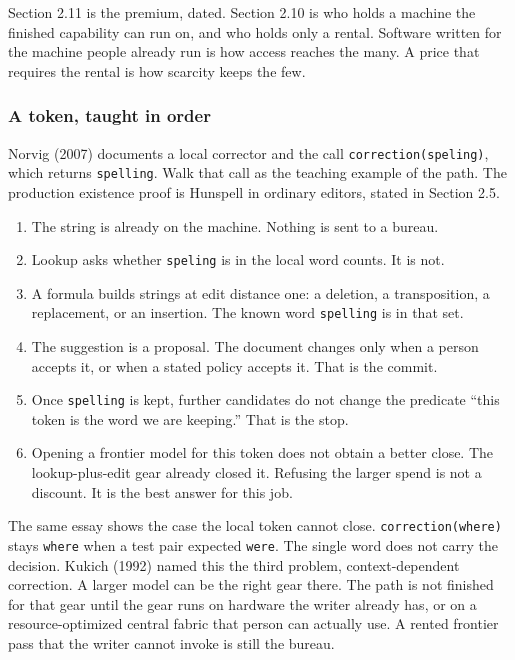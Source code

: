 \documentclass[
  10pt,
]{article}
\providecommand{\tightlist}{%
  \setlength{\itemsep}{0pt}\setlength{\parskip}{0pt}}
\begin{document}
Section 2.11 is the premium, dated. Section 2.10 is who holds a machine
the finished capability can run on, and who holds only a rental.
Software written for the machine people already run is how access
reaches the many. A price that requires the rental is how scarcity keeps
the few.

\subsubsection{A token, taught in order}\label{a-token-taught-in-order}

Norvig (2007) documents a local corrector and the call
\texttt{correction(\textquotesingle{}speling\textquotesingle{})}, which
returns \texttt{spelling}. Walk that call as the teaching example of the
path. The production existence proof is Hunspell in ordinary editors,
stated in Section 2.5.

\begin{enumerate}
\def\labelenumi{\arabic{enumi}.}
\tightlist
\item
  The string is already on the machine. Nothing is sent to a bureau.
\item
  Lookup asks whether \texttt{speling} is in the local word counts. It
  is not.
\item
  A formula builds strings at edit distance one: a deletion, a
  transposition, a replacement, or an insertion. The known word
  \texttt{spelling} is in that set.
\item
  The suggestion is a proposal. The document changes only when a person
  accepts it, or when a stated policy accepts it. That is the commit.
\item
  Once \texttt{spelling} is kept, further candidates do not change the
  predicate ``this token is the word we are keeping.'' That is the stop.
\item
  Opening a frontier model for this token does not obtain a better
  close. The lookup-plus-edit gear already closed it. Refusing the
  larger spend is not a discount. It is the best answer for this job.
\end{enumerate}

The same essay shows the case the local token cannot close.
\texttt{correction(\textquotesingle{}where\textquotesingle{})} stays
\texttt{where} when a test pair expected \texttt{were}. The single word
does not carry the decision. Kukich (1992) named this the third problem,
context-dependent correction. A larger model can be the right gear
there. The path is not finished for that gear until the gear runs on
hardware the writer already has, or on a resource-optimized central
fabric that person can actually use. A rented frontier pass that the
writer cannot invoke is still the bureau.
\end{document}
